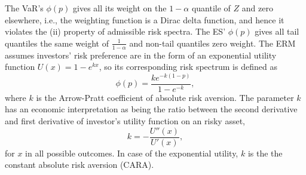 The VaR's $\phi(p)$ gives all its weight on the $1-\alpha$ quantile of
$Z$ and zero elsewhere, i.e., the weighting function is a Dirac delta
function, and hence it violates the (ii) property of admissible risk
spectra.  
The ES' $\phi(p)$ gives all tail quantiles the same weight of
$\displaystyle\frac{1}{1-\alpha}$ and non-tail quantiles zero weight. 
The ERM assumes investors' risk preference are in the form of an
exponential utility function $U(x)=1-e^{kx}$, so its corresponding
risk spectrum is defined as
\begin{equation*}
  \phi(p) =\frac{k e^{-k(1-p)}}{1-e^{-k}} , \label{eq:phi}
\end{equation*}
where $k$ is the Arrow-Pratt coefficient of absolute risk aversion. 
The parameter $k$ has an economic interpretation as being the ratio
between the second derivative and first derivative 
of investor's utility function on an risky asset,
\begin{equation*}
  k = -\frac{U''(x)}{U'(x)},
\end{equation*}
for $x$ in all possible outcomes.
In case of the exponential utility, $k$ is the the constant absolute risk aversion (CARA).

